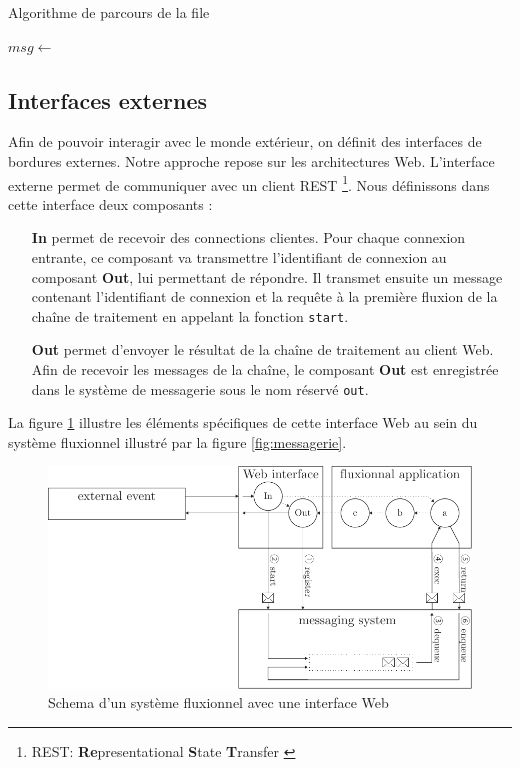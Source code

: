\begin{algorithm}
\caption{Algorithme de parcours de la file}
\label{alg:parcours}
\begin{algorithmic}
\State $msg \gets$  
\State {}
\EndWhile
\EndFunction
\end{algorithmic}
\end{algorithm}

\subsection{Interfaces externes}

Afin de pouvoir interagir avec le monde extérieur, on définit des interfaces de bordures externes.
Notre approche repose sur les architectures Web.
L'interface externe permet de communiquer avec un client REST \footnote{REST: \textbf{Re}presentational \textbf{S}tate \textbf{T}ransfer \cite{Fielding2002}}.
Nous définissons dans cette interface deux composants :

\begin{itemize}
	\item[\textbf{In}]
    permet de recevoir des connections clientes.
    Pour chaque connexion entrante, ce composant va transmettre l'identifiant de connexion au composant \textbf{Out}, lui permettant de répondre.
    Il transmet ensuite un message contenant l'identifiant de connexion et la requête à la première fluxion de la chaîne de traitement en appelant la fonction \texttt{start}.
	\item[\textbf{Out}]
    permet d'envoyer le résultat de la chaîne de traitement au client Web.
    Afin de recevoir les messages de la chaîne, le composant \textbf{Out} est enregistrée dans le système de messagerie sous le nom réservé \texttt{out}.
\end{itemize}


La figure \ref{fig:schemaweb} illustre les éléments spécifiques de cette interface Web au sein du système fluxionnel illustré par la figure \ref{fig:messagerie}.

\begin{figure}[h!]
	\includegraphics[width=\linewidth]{schema-web.pdf}
	\caption{Schema d'un système fluxionnel avec une interface Web}
	\label{fig:schemaweb}
\end{figure}

